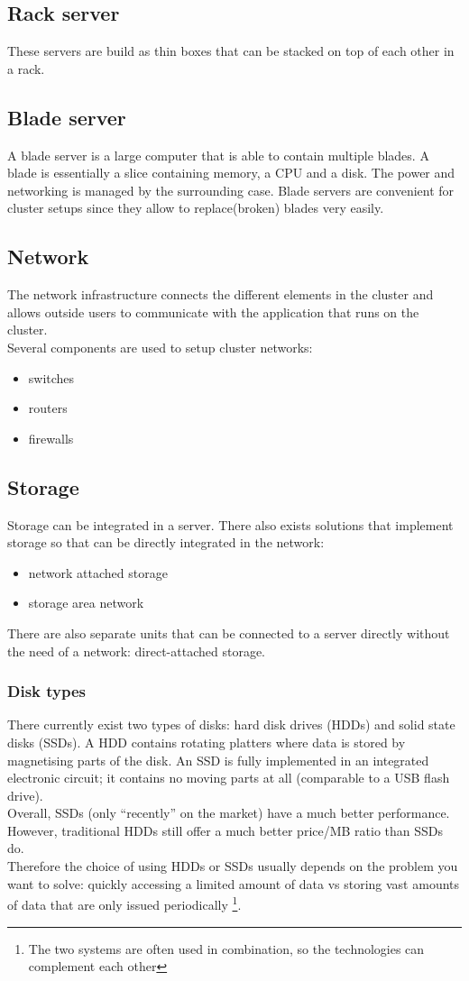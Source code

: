 \documentclass[12pt]{report}
\begin{document}
\subsection{Rack server}
These servers are build as thin boxes that can be stacked on top of each other in a rack.
\subsection{Blade server}
A blade server is a large computer that is able to contain multiple
  blades. A blade is essentially a slice containing memory, a CPU and a
  disk. The power and networking is managed by the surrounding case.
 Blade servers are convenient for cluster setups since they
   allow to replace(broken) blades very easily.
\subsection{Network}
The network infrastructure connects the different elements in the
cluster and allows outside users to communicate with the application
that runs on the cluster.\\
Several components are used to setup cluster networks:
\begin{itemize}
\item switches
\item routers
\item firewalls
\end{itemize}
\subsection{Storage}
Storage can be integrated in a server. There 
also exists solutions that implement storage so that can be directly
integrated in the network:
\begin{itemize}
\item network attached storage 
\item storage area network
\end{itemize}
There are also separate units that can be connected to a server directly
without the need of a network: direct-attached storage.
\subsubsection{Disk types}
There currently exist two types of disks: hard disk drives (HDDs) and
solid state disks (SSDs). A HDD contains rotating platters where data
is stored by magnetising parts of the disk. An SSD is fully
implemented in an integrated electronic circuit; it contains no moving
parts at all (comparable to a USB flash drive).\\
Overall, SSDs (only ``recently'' on the market) have a much better
performance. However, traditional HDDs still offer a much better
price/MB ratio than SSDs do.\\
Therefore the choice of using HDDs or SSDs usually depends on the
problem you want to solve: quickly accessing a limited amount of data
vs storing vast amounts of data that are only issued
periodically \footnote{The two systems are often used in combination,
so the technologies can complement each other}.
\end{document}
